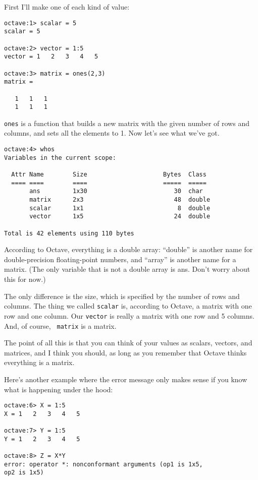 First I'll make one of each kind of value:

\begin{verbatim}
octave:1> scalar = 5
scalar = 5

octave:2> vector = 1:5
vector = 1   2   3   4   5

octave:3> matrix = ones(2,3)
matrix =

   1   1   1
   1   1   1
\end{verbatim}

{\tt ones} is a function that builds a new matrix with the given
number of rows and columns, and sets all the elements to 1.
Now let's see what we've got.

\begin{verbatim}
octave:4> whos
Variables in the current scope:

  Attr Name        Size                     Bytes  Class
  ==== ====        ====                     =====  ===== 
       ans         1x30                        30  char
       matrix      2x3                         48  double
       scalar      1x1                          8  double
       vector      1x5                         24  double

Total is 42 elements using 110 bytes
\end{verbatim}

According to Octave, everything is a double array: ``double''
is another name for double-precision floating-point numbers,
and ``array'' is another name for a matrix. (The only variable that is not a
double array is ans. Don't worry about this for now.)

The only difference is the size, which is specified by the number of
rows and columns. The thing we called {\tt scalar} is, according to
Octave, a matrix with one row and one column. Our {\tt vector} is
really a matrix with one row and 5 columns. And, of course, {\tt
matrix} is a matrix.

The point of all this is that you can think of your values as
scalars, vectors, and matrices, and I think you should, as long
as you remember that Octave thinks everything is a matrix.

Here's another example where the error message only makes sense
if you know what is happening under the hood:

\begin{verbatim}
octave:6> X = 1:5
X = 1   2   3   4   5

octave:7> Y = 1:5
Y = 1   2   3   4   5

octave:8> Z = X*Y
error: operator *: nonconformant arguments (op1 is 1x5, 
op2 is 1x5)
\end{verbatim}


